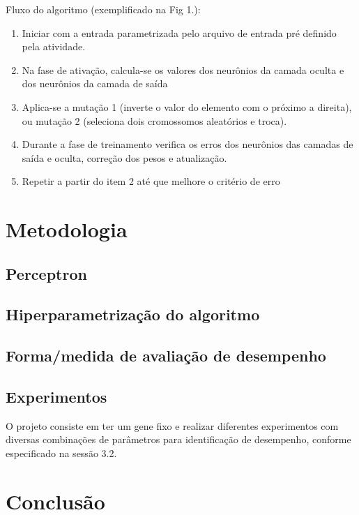 \documentclass[runningheads]{llncs}
\begin{document}
Fluxo do algoritmo (exemplificado na Fig 1.):
\begin{enumerate}
	\item Iniciar com a entrada parametrizada pelo arquivo de entrada pré definido pela atividade.
	\item Na fase de ativação, calcula-se os valores dos neurônios da camada oculta e dos neurônios da camada de saída
	\item Aplica-se a mutação 1 (inverte o valor do elemento com o próximo a direita), ou mutação 2 (seleciona dois cromossomos aleatórios e troca).
	\item Durante a fase de treinamento verifica os erros dos neurônios das camadas de saída e oculta, correção dos pesos e atualização.
	\item Repetir a partir do item 2 até que melhore o critério de erro
\end{enumerate}

\section{Metodologia}

\subsection{Perceptron}

\subsection{Hiperparametrização do algoritmo}


\subsection{Forma/medida de avaliação de desempenho}

\subsection{Experimentos}


O projeto consiste em ter um gene fixo e realizar diferentes experimentos com diversas combinações de parâmetros para identificação de desempenho, conforme especificado na sessão 3.2. 


\section{Conclusão}

%
%
%
% 
% 
%
\end{document}
